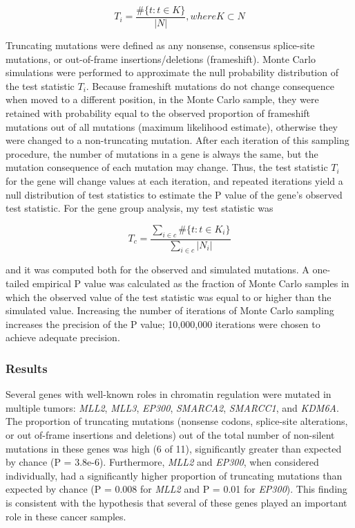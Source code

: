 \begin{equation}
T_i = \frac{\#\{t : t\in K\}}{|N|}, where K\subset N
\end{equation}

Truncating mutations were defined as any nonsense, consensus splice-site mutations, or out-of-frame insertions/deletions (frameshift). Monte Carlo simulations were performed to approximate the null probability distribution of the test statistic $T_i$. Because frameshift mutations do not change consequence when moved to a different position, in the Monte Carlo sample, they were retained with probability equal to the observed proportion of frameshift mutations out of all mutations (maximum likelihood estimate), otherwise they were changed to a non-truncating mutation. After each iteration of this sampling procedure, the number of mutations in a gene is always the same, but the mutation consequence of each mutation may change. Thus, the test statistic $T_i$ for the gene will change values at each iteration, and repeated iterations yield a null distribution of test statistics to estimate the P value of the gene's observed test statistic. For the gene group analysis, my test statistic was

\begin{equation}
T_c = \frac{\sum_{i\in c}{\#\{t:t\in K_i\}}}{\sum_{i\in c}{|N_i|}}
\end{equation}

and it was computed both for the observed and simulated mutations. A one-tailed empirical P value was calculated as the fraction of Monte Carlo samples in which the observed value of the test statistic was equal to or higher than the simulated value. Increasing the number of iterations of Monte Carlo sampling increases the precision of the P value; 10,000,000 iterations were chosen to achieve adequate precision.

\subsubsection{Results}

Several genes with well-known roles in chromatin regulation were mutated in multiple tumors: \textit{MLL2}, \textit{MLL3}, \textit{EP300}, \textit{SMARCA2}, \textit{SMARCC1}, and \textit{KDM6A}. The proportion of truncating mutations (nonsense codons, splice-site alterations, or out of-frame insertions and deletions) out of the total number of non-silent mutations in these genes was high (6 of 11), significantly greater than expected by chance (P = 3.8e-6). Furthermore, \textit{MLL2} and \textit{EP300}, when considered individually, had a significantly higher proportion of truncating mutations than expected by chance (P = 0.008 for \textit{MLL2} and P = 0.01 for \textit{EP300}). This finding is consistent with the hypothesis that several of these genes played an important role in these cancer samples.

